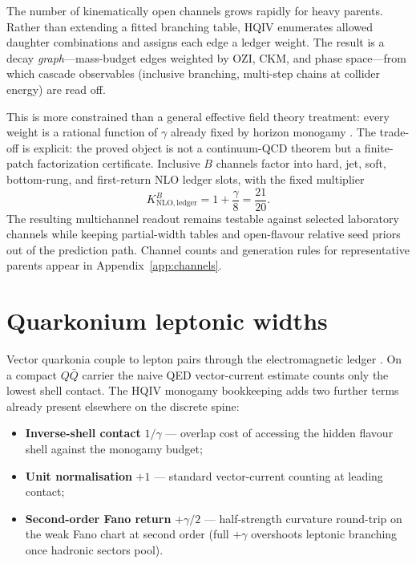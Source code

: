 \documentclass[11pt]{amsart}
\begin{document}
The number of kinematically open channels grows rapidly for heavy parents.
Rather than extending a fitted branching table, HQIV enumerates allowed daughter
combinations and assigns each edge a ledger weight.
The result is a decay \emph{graph}---mass-budget edges weighted by OZI, CKM, and
phase space---from which cascade observables (inclusive branching, multi-step
chains at collider energy) are read off.

This is more constrained than a general effective field theory treatment:
every weight is a rational function of $\gamma$ already fixed by horizon
monogamy \cite{hqiv-3d-growth-paper}.
The trade-off is explicit: the proved object is not a continuum-QCD theorem but a
finite-patch factorization certificate.  Inclusive $B$ channels factor into hard,
jet, soft, bottom-rung, and first-return NLO ledger slots, with the fixed multiplier
\begin{equation}
  K^{B}_{\mathrm{NLO,ledger}} = 1+\frac{\gamma}{8} = \frac{21}{20}.
\end{equation}
The resulting multichannel readout remains testable against selected laboratory
channels while keeping partial-width tables and open-flavour relative seed
priors out of the prediction path.
Channel counts and generation rules for representative parents appear in
Appendix~\ref{app:channels}.

\section{Quarkonium leptonic widths}
\label{sec:quarkonium-em}

Vector quarkonia couple to lepton pairs through the electromagnetic ledger
\cite{peskin1995,schwartz2014,pdg2024}.
On a compact $Q\bar Q$ carrier the naive QED vector-current estimate counts
only the lowest shell contact.
The HQIV monogamy bookkeeping adds two further terms already present elsewhere
on the discrete spine:

\begin{itemize}[leftmargin=2em]
\item \textbf{Inverse-shell contact} $1/\gamma$ --- overlap cost of accessing the
  hidden flavour shell against the monogamy budget;
\item \textbf{Unit normalisation} $+1$ --- standard vector-current counting at
  leading contact;
\item \textbf{Second-order Fano return} $+\gamma/2$ --- half-strength curvature round-trip
  on the weak Fano chart at second order (full $+\gamma$ overshoots leptonic
  branching once hadronic sectors pool).
\end{itemize}
\end{document}
